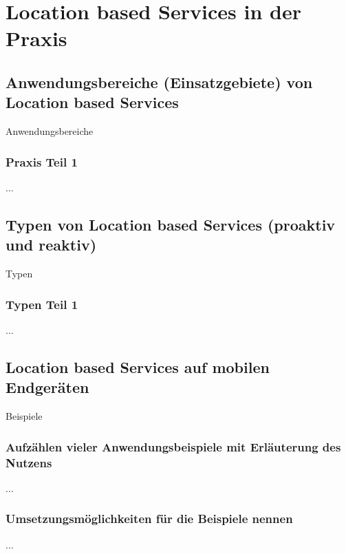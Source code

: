 \section{Location based Services in der Praxis}
	\subsection{Anwendungsbereiche (Einsatzgebiete) von Location based Services}
Anwendungsbereiche
		\subsubsection{Praxis Teil 1}
...
	\subsection{Typen von Location based Services (proaktiv und reaktiv)}
Typen
	\subsubsection{Typen Teil 1}
...
	\subsection{Location based Services auf mobilen Endgeräten}
Beispiele
	\subsubsection{Aufzählen vieler Anwendungsbeispiele mit Erläuterung des Nutzens}
...
	\subsubsection{Umsetzungsmöglichkeiten für die Beispiele nennen}
...